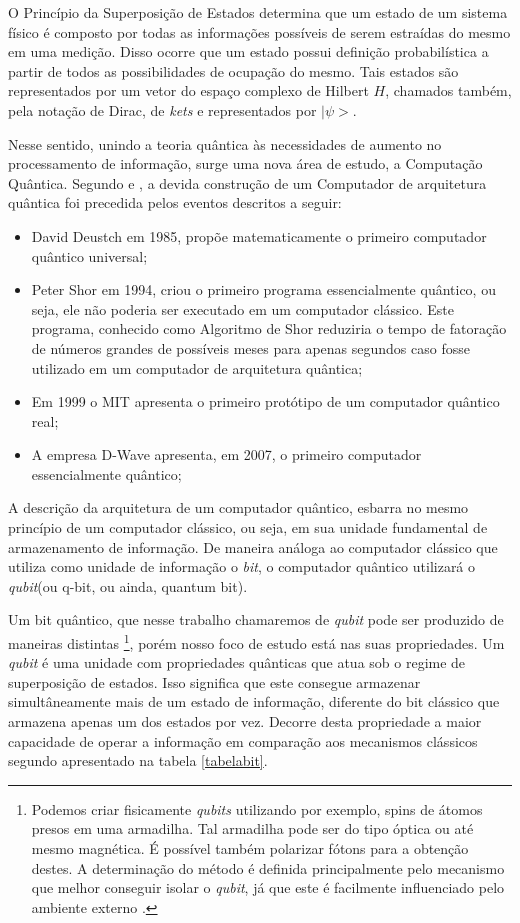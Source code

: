 \documentclass[11pt,oneside,brazil,hidelinks,article,sumario=tradicional,a4paper]{abntex2}
\begin{document}
O Princípio da Superposição de Estados determina que um estado de um sistema físico é composto por todas as informações possíveis de serem estraídas do mesmo em uma medição. Disso ocorre que um estado possui definição probabilística a partir de todos as possibilidades de ocupação do mesmo. Tais estados são representados por um vetor do espaço complexo de Hilbert $H$, chamados também, pela notação de Dirac, de \textit{kets} e representados por $|\psi>$.

Nesse sentido, unindo a teoria quântica às necessidades de aumento no processamento de informação, surge uma nova área de estudo, a Computação Quântica. Segundo \textcite{CompInfoQuantica} e \textcite{dwave}, a devida construção de um Computador de arquitetura quântica foi precedida pelos eventos descritos a seguir:

\begin{itemize}
\item  David Deustch em 1985, propõe matematicamente o primeiro computador quântico universal;
\item Peter Shor em 1994, criou o primeiro programa essencialmente quântico, ou seja, ele não poderia ser executado em um computador clássico. Este programa, conhecido como Algoritmo de Shor reduziria o tempo de fatoração de números grandes de possíveis meses para apenas segundos caso fosse utilizado em um computador de arquitetura quântica;
\item Em 1999 o MIT apresenta o primeiro protótipo de um computador quântico real;
\item A empresa D-Wave apresenta, em 2007, o primeiro computador essencialmente quântico;
\end{itemize}


A descrição da arquitetura de um computador quântico, esbarra no mesmo princípio de um computador clássico, ou seja, em sua unidade fundamental de armazenamento de informação. De maneira análoga ao computador clássico que utiliza como unidade de informação o \textit{bit}, o computador quântico utilizará o \textit{qubit}(ou q-bit, ou ainda, quantum bit). 

Um bit quântico, que nesse trabalho chamaremos de \textit{qubit} pode ser produzido de maneiras distintas \footnote{Podemos criar fisicamente \textit{qubits} utilizando por exemplo, spins de átomos presos em uma armadilha. Tal armadilha pode ser do tipo óptica ou até mesmo magnética. É possível também polarizar fótons para a obtenção destes. A determinação do método é definida principalmente pelo mecanismo que melhor conseguir isolar o \textit{qubit}, já que este é facilmente influenciado pelo ambiente externo \cite{materialdidaticomecquantica}.}, porém nosso foco de estudo está nas suas propriedades. Um \textit{qubit} é uma unidade com propriedades quânticas que atua sob o regime de superposição de estados. Isso significa que este consegue armazenar simultâneamente mais de um estado de informação, diferente do bit clássico que armazena apenas um dos estados por vez. Decorre desta propriedade a maior capacidade de operar a informação em comparação aos mecanismos clássicos segundo apresentado na tabela \ref{tabelabit}.
\end{document}
